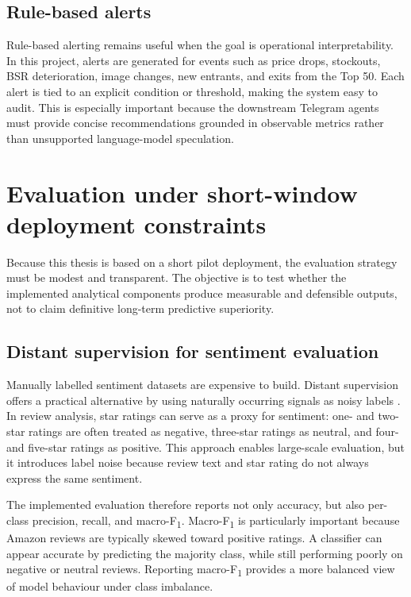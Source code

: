 \subsection{Rule-based alerts}

Rule-based alerting remains useful when the goal is operational
interpretability. In this project, alerts are generated for events such
as price drops, stockouts, BSR deterioration, image changes, new
entrants, and exits from the Top 50. Each alert is tied to an explicit
condition or threshold, making the system easy to audit. This is
especially important because the downstream Telegram agents must provide
concise recommendations grounded in observable metrics rather than
unsupported language-model speculation.

\section{Evaluation under short-window deployment constraints}

Because this thesis is based on a short pilot deployment, the evaluation
strategy must be modest and transparent. The objective is to test whether
the implemented analytical components produce measurable and defensible
outputs, not to claim definitive long-term predictive superiority.

\subsection{Distant supervision for sentiment evaluation}

Manually labelled sentiment datasets are expensive to build. Distant
supervision offers a practical alternative by using naturally occurring
signals as noisy labels \citep{go2009twitter}. In review analysis,
star ratings can serve as a proxy for sentiment: one- and two-star
ratings are often treated as negative, three-star ratings as neutral, and
four- and five-star ratings as positive. This approach enables
large-scale evaluation, but it introduces label noise because review
text and star rating do not always express the same sentiment.

The implemented evaluation therefore reports not only accuracy, but also
per-class precision, recall, and macro-F\textsubscript{1}. Macro-F\textsubscript{1}
is particularly important because Amazon reviews are typically skewed
toward positive ratings. A classifier can appear accurate by predicting
the majority class, while still performing poorly on negative or neutral
reviews. Reporting macro-F\textsubscript{1} provides a more balanced view
of model behaviour under class imbalance.

